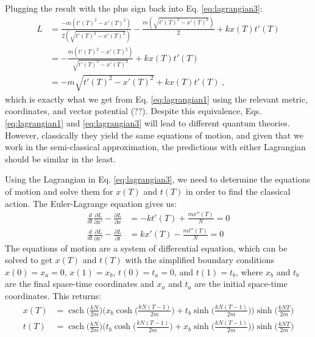 \documentclass[12pt]{revtex4}
\DeclareMathOperator{\csch}{csch}
\begin{document}
Plugging the result with the plus sign back into Eq. \ref{eq:lagrangian3}:
\begin{align} 
L &= \frac{-m (t'(T)^2 - x'(T)^2)}{2\left(\sqrt{t'(T)^2-x'(T)^2}\right)} -\frac{m \left(\sqrt{t'(T)^2-x'(T)^2}\right)}{2} + k x(T) t'(T) \\
&= -\frac{m (t'(T)^2 - x'(T)^2)}{\sqrt{t'(T)^2-x'(T)^2}} + k x(T) t'(T)\\
&= -m \sqrt{t'(T)^2-x'(T)^2} + k x(T) t'(T) \;,
\end{align}
which is exactly what we get from Eq. \ref{eq:lagrangian1} using the relevant metric, coordinates, and vector potential (??). Despite this equivalence, Eqs. \ref{eq:lagrangian1} and \ref{eq:lagrangian3} will lead to different quantum theories. However, classically they yield the same equations of motion, and given that we work in the semi-classical approximation, the predictions with either Lagrangian should be similar in the least.

Using the Lagrangian in Eq. \ref{eq:lagrangian3}, we need to determine the equations of motion and solve them for $x(T)$ and $t(T)$ in order to find the classical action. The Euler-Lagrange equation gives us:
\begin{align*}
\frac{d}{dt}\frac{\partial L}{\partial x'}-\frac{\partial L}{\partial x} &= -k t'(T) + \frac{m x''(T)}{N} =0\\
\frac{d}{dt}\frac{\partial L}{\partial x'}-\frac{\partial L}{\partial t} &= k x'(T) - \frac{m t''(T)}{N} =0
\end{align*}
The equations of motion are a system of differential equation, which can be solved to get $x(T)$ and $t(T)$ with the simplified boundary conditions $x(0) = x_a = 0$, $x(1)=x_b$, $t(0) = t_a = 0$, and $t(1)=t_b$, where $x_b$ and $t_b$ are the final space-time coordinates and $x_a$ and $t_a$ are the initial space-time coordinates. This returns:
\begin{align*}
x(T) &= \csch \bigg(\frac{k N}{2 m}\bigg) \Biggr(x_b \cosh\bigg(\frac{k N (T-1)}{2m}\bigg)+ 
t_b \sinh\bigg(\frac{k N (T-1)}{2m}\bigg)\Biggr) \sinh\bigg(\frac{k N T}{2m}\bigg)\\
t(T)&= \csch \bigg(\frac{k N}{2 m}\bigg) \Biggr(t_b \cosh\bigg(\frac{k N (T-1)}{2m}\bigg)+ 
x_b \sinh\bigg(\frac{k N (T-1)}{2m}\bigg)\Biggr) \sinh\bigg(\frac{k N T}{2m}\bigg)
\end{align*} 
\end{document}
